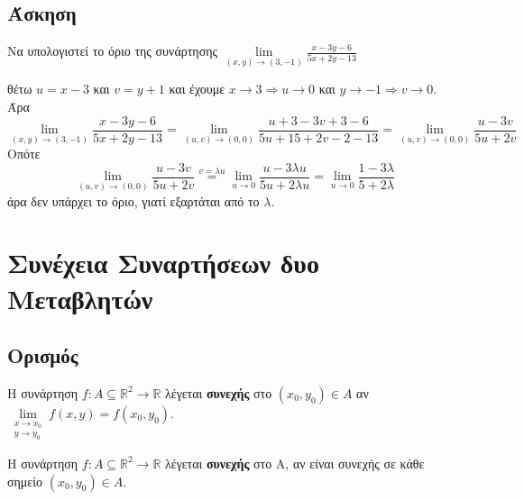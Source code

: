 \documentclass[a4paper,11pt]{report}
\begin{document}
\section{Άσκηση}

\begin{exercise}
  Να υπολογιστεί το όριο της συνάρτησης 
  $ \lim\limits_{(x,y)\to (3, -1)} \frac{x-3y-6}{5x+2y-13} $ 
  \begin{solution}
    θέτω $ u=x-3 $ και $ v=y+1 $ και έχουμε $ x \to 3 \Rightarrow u \to 0 $ και 
    $ y \to -1 \Rightarrow v \to 0 $. Άρα
    \[
      \lim\limits_{(x,y)\to (3, -1)} \frac{x-3y-6}{5x+2y-13} = \lim_{(u,v) \to (0,0)} 
      \frac{u+3-3v+3-6}{5u+15+2v-2-13} = \lim_{(u,v) \to (0,0)} \frac{u-3v}{5u+2v}
    \] 
    Οπότε
    \[
      \lim_{(u,v) \to (0,0)} \frac{u-3v}{5u+2v} \overset{v= \lambda u}{=} 
      \lim_{u \to 0} \frac{u- 3 \lambda u}{5u + 2 \lambda u} = \lim_{u \to 0}
      \frac{1 - 3 \lambda}{5 + 2 \lambda}
    \]
    άρα δεν υπάρχει το όριο, γιατί εξαρτάται από το $ \lambda $.
  \end{solution}
\end{exercise}



\chapter{Συνέχεια Συναρτήσεων δυο Μεταβλητών}

\section{Ορισμός}

\begin{mybox1}
  \begin{dfn}
    Η συνάρτηση $ f \colon A \subseteq \mathbb{R}^{2} \to \mathbb{R} $ 
    λέγεται \textcolor{Col1}{\textbf{συνεχής}} στο $ (x_{0}, y_{0}) \in A $ αν 
    $ \lim\limits_{\substack{x\to x_{0} \\y \to y_{0}}} f(x,y) = f(x_{0}, y_{0}) $.
  \end{dfn}
\end{mybox1}

\begin{mybox1}
  \begin{dfn}
    Η συνάρτηση $ f \colon A \subseteq \mathbb{R}^{2} \to \mathbb{R} $ 
    λέγεται \textcolor{Col1}{\textbf{συνεχής}} στο Α, αν είναι συνεχής σε κάθε σημείο 
    $ (x_{0}, y_{0}) \in A $.
  \end{dfn}
\end{mybox1}
\end{document}
